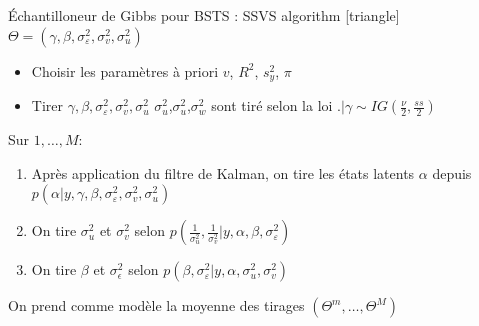 \begin{frame}
    \small
\begin{exampleblock}{\'Echantilloneur de Gibbs pour BSTS : SSVS algorithm}
    [triangle]
    $\Theta=\left(\gamma, \beta, \sigma_{\varepsilon}^{2}, \sigma_{v}^{2}, \sigma_{u}^{2}\right)$
    \begin{itemize}
    \item Choisir les paramètres à priori $v$, $R^2$, $s_y^2$, $\pi$ 
    \item Tirer $\gamma, \beta, \sigma_{\varepsilon}^{2}, \sigma_{v}^{2}, \sigma_{u}^{2}$ \hfill $\sigma_u^2$,$\sigma_u^2$,$\sigma_w^2$ sont tiré selon la loi $. | \gamma \sim I G\left(\frac{\nu}{2}, \frac{s s}{2}\right)$
    \end{itemize}
Sur $1, \ldots, M$:
\begin{enumerate}
\item Après application du filtre de Kalman, on tire les états latents $\alpha$ depuis $p\left(\alpha | y, \gamma, \beta, \sigma_{\varepsilon}^{2}, \sigma_{v}^{2}, \sigma_{u}^{2}\right)$
\item On tire $\sigma_u^2$ et $\sigma_v^2$ selon $p\left(\frac{1}{\sigma_{u}^{2}}, \frac{1}{\sigma_{v}^{2}} | y, \alpha, \beta, \sigma_{\varepsilon}^{2}\right)$
\item On tire $\beta$ et $\sigma_\epsilon^2$ selon $p\left(\beta, \sigma_{\varepsilon}^{2} | y, \alpha, \sigma_{u}^{2}, \sigma_{v}^{2}\right)$
\end{enumerate}

On prend comme modèle la moyenne des tirages $\left(\Theta^m, \ldots, \Theta^M\right)$

\end{exampleblock}

\end{frame}
